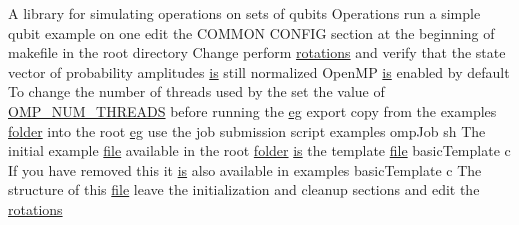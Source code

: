 \begin{DoxyCompactItemize}
\item 
A library for simulating operations on sets of qubits Operations run a simple qubit example on one edit the COMMON CONFIG section at the beginning of makefile in the root directory Change perform \hyperlink{README_8md_a168d0f076329da35a2b080049c35cecd}{rotations} and verify that the state vector of probability amplitudes \hyperlink{README_8md_ac361bc388656077907485b42e1531a85}{is} still normalized OpenMP \hyperlink{README_8md_ac361bc388656077907485b42e1531a85}{is} enabled by default To change the number of threads used by the set the value of \hyperlink{README_8md_ac0f875e6c5b5526a6781e0fbba81e6a4}{OMP\_\-NUM\_\-THREADS} before running the \hyperlink{README_8md_a60a90a09308ad7ec0ea2ac389281518b}{eg} export copy from the examples \hyperlink{README_8md_ac5527449269e33be598e819921cd9e43}{folder} into the root \hyperlink{README_8md_a60a90a09308ad7ec0ea2ac389281518b}{eg} use the job submission script examples ompJob sh The initial example \hyperlink{README_8md_a5078360f0afc4e756290c3197d1abfe9}{file} available in the root \hyperlink{README_8md_ac5527449269e33be598e819921cd9e43}{folder} \hyperlink{README_8md_ac361bc388656077907485b42e1531a85}{is} the template \hyperlink{README_8md_a5078360f0afc4e756290c3197d1abfe9}{file} basicTemplate c If you have removed this it \hyperlink{README_8md_ac361bc388656077907485b42e1531a85}{is} also available in examples basicTemplate c The structure of this \hyperlink{README_8md_a5078360f0afc4e756290c3197d1abfe9}{file} leave the initialization and cleanup sections and edit the \hyperlink{README_8md_a168d0f076329da35a2b080049c35cecd}{rotations}
\item 

\end{DoxyCompactItemize}
